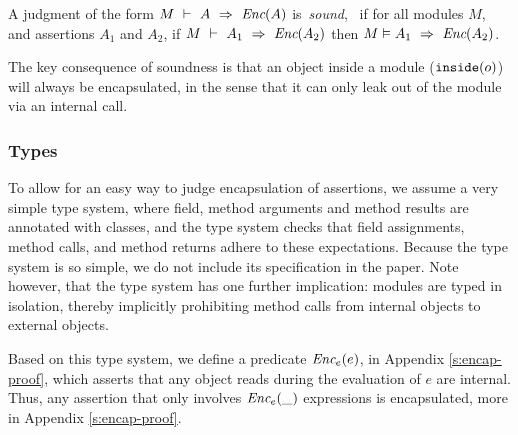 \begin{definition}
\label{lem:encap-soundness}
A judgment of the form $M\ \vdash\ A\ \Rightarrow\ \textit{Enc}(A)$  is\  \emph{sound}, \ if 
for all modules $M$, and assertions $A_1$ and $A_2$, if 
$M\ \vdash\ A_1\ \Rightarrow\ \textit{Enc}(A_2)$ then $M \vDash A_1\ \Rightarrow\ \textit{Enc}(A_2)$.
\end{definition}

\noindent 
The key consequence of soundness is that an object inside a
  module ($\texttt{inside}( o )$) 
  will always be encapsulated, in the sense that it can only leak out
  of the module via an internal call.





\subsubsection{Types}
\label{types}

To allow for an easy way to judge encapsulation of
assertions, we assume a very simple type system, where field, method arguments
and method results are annotated with classes, and the type system checks 
that field assignments, method calls, and method returns adhere to these expectations.
Because the type system is so simple, we do not include its specification in the paper.
Note however, that the type system has one further implication: modules are typed 
in isolation, thereby implicitly prohibiting
method calls from internal objects to external objects. 

Based on this type system, we define a predicate $\textit{Enc$_e$}(e)$, in Appendix \ref{s:encap-proof},
which asserts that any object reads during the evaluation of $e$ are internal.
Thus, any assertion that only involves $\textit{Enc$_e$}(\_)$ expressions is encapsulated, more in Appendix \ref{s:encap-proof}.

